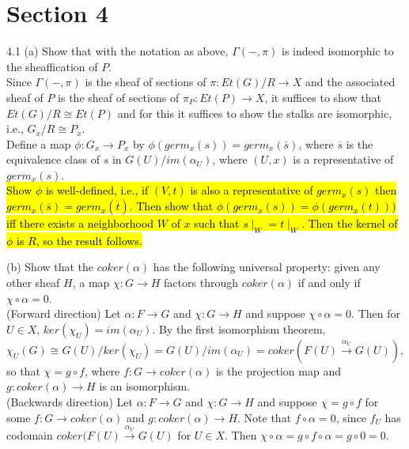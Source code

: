  \newpage
\section*{Section 4}
4.1 (a) Show that with the notation as above, $\Gamma(-, \pi)$ is indeed isomorphic to the sheaffication of $P$. \\

Since $\Gamma(-, \pi)$ is the sheaf of sections of $\pi: Et(G)/R \rightarrow X$ and the associated sheaf of $P$ is the sheaf of sections of $\pi_P:Et(P) \rightarrow X$, it suffices to show that $Et(G)/R \cong Et(P)$ and for this it suffices to show the stalks are isomorphic, i.e., $G_x/R \cong P_x$. \\

Define a map $\phi: G_x \rightarrow P_x$ by $\phi(germ_x(s)) = germ_x(\overline{s})$, where $\overline{s}$ is the equivalence class of $s$ in  $G(U)/im(\alpha_U)$, where $(U,x)$ is a representative of $germ_x(s)$.
\\\hl{Show $\phi$ is well-defined, i.e., if $(V,t)$ is also a representative of $germ_x(s)$ then $germ_x(\overline{s}) =germ_x(\overline{t})$.
Then show that $\phi(germ_x(s)) = \phi(germ_x(t)))$ iff there exists a neighborhood $W$ of $x$ such that $s\mid_W = t\mid_W$. Then the kernel of $\phi$ is $R$, so the result follows.}
 


(b) Show that the $coker(\alpha)$ has the following universal property: given any other sheaf $H$, a map $\chi: G \rightarrow H$ factors through $coker(\alpha)$ if and only if $\chi \circ \alpha = 0$.\\

(Forward direction) Let $\alpha:F \rightarrow G$ and $\chi:G \rightarrow H$ and suppose $\chi \circ \alpha =0$. Then for $U \in X$, $ker(\chi_U) = im(\alpha_U)$. By the first isomorphism theorem, $\chi_U(G) \cong G(U)/ker(\chi_U) = G(U)/im(\alpha_U) = coker(F(U) \xrightarrow{\alpha_U} G(U)) $, so that $\chi = g \circ f$, where $f:G \rightarrow coker(\alpha)$ is the projection map and $g:coker(\alpha) \rightarrow H$ is an isomorphism.\\

(Backwards direction) Let $\alpha:F \rightarrow G$ and $\chi:G \rightarrow H$ and suppose $\chi= g \circ f$ for some $f:G \rightarrow coker(\alpha)$ and $g:coker(\alpha) \rightarrow H$. Note that $f \circ \alpha = 0$, since $f_U$ has codomain $coker(F(U) \xrightarrow{\alpha_U} G(U)$ for $U \in X$. Then $\chi \circ \alpha = g \circ f \circ \alpha = g \circ 0 =0$.

